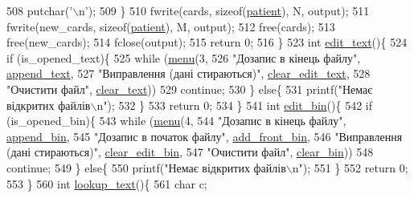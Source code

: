 \begin{DoxyCodeInclude}
{{{{{508         putchar(\textcolor{charliteral}{'\(\backslash\)n'});
509     \}
510     fwrite(cards, \textcolor{keyword}{sizeof}(\hyperlink{structpatient__struct}{patient}), N, output);
511     fwrite(new\_cards, \textcolor{keyword}{sizeof}(\hyperlink{structpatient__struct}{patient}), M, output);
512     free(cards);
513     free(new\_cards);
514     fclose(output);
515     \textcolor{keywordflow}{return} 0;
516 \}
523 \textcolor{keywordtype}{int} \hyperlink{main_8c_ab359f03309c64d2e7fb3eac80e34160f}{edit\_text}()\{
524     \textcolor{keywordflow}{if} (is\_opened\_text)\{
525         \textcolor{keywordflow}{while} (\hyperlink{lab__functions_8h_a5f3f744789213f961f3c8ec1cc482af7}{menu}(3,
526                 \textcolor{stringliteral}{"Дозапис в кінець файлу"}, \hyperlink{main_8c_ad69ac85cc5d44de29b1448bd72937203}{append\_text},
527                 \textcolor{stringliteral}{"Виправлення (дані стираються)"}, \hyperlink{main_8c_af649673615b84141d61a31bf103e436a}{clear\_edit\_text},
528                 \textcolor{stringliteral}{"Очистити файл"}, \hyperlink{main_8c_a69f822b267f0ba6c163047774f960aa8}{clear\_text}))
529             \textcolor{keywordflow}{continue};
530     \} \textcolor{keywordflow}{else}\{
531         printf(\textcolor{stringliteral}{"Немає відкритих файлів\(\backslash\)n"});
532     \}
533     \textcolor{keywordflow}{return} 0;
534 \}
541 \textcolor{keywordtype}{int} \hyperlink{main_8c_af33bf0e042c671b0a02da4460055fca1}{edit\_bin}()\{
542     \textcolor{keywordflow}{if} (is\_opened\_bin)\{
543         \textcolor{keywordflow}{while} (\hyperlink{lab__functions_8h_a5f3f744789213f961f3c8ec1cc482af7}{menu}(4,
544                     \textcolor{stringliteral}{"Дозапис в кінець файлу"}, \hyperlink{main_8c_a5e87855f218fa953fdc1649bf832bb9c}{append\_bin},
545                     \textcolor{stringliteral}{"Дозапис в початок файлу"}, \hyperlink{main_8c_ab15bf3ab548bb875cba6b67d6d7a4cc4}{add\_front\_bin},
546                     \textcolor{stringliteral}{"Виправлення (дані стираються)"}, \hyperlink{main_8c_aca18af51c5eba9da8b5ffabbaf06c01f}{clear\_edit\_bin},
547                     \textcolor{stringliteral}{"Очистити файл"}, \hyperlink{main_8c_ae4a97e0e6277901e41f56dd2cb52aeaa}{clear\_bin}))
548             \textcolor{keywordflow}{continue};
549     \} \textcolor{keywordflow}{else}\{
550         printf(\textcolor{stringliteral}{"Немає відкритих файлів\(\backslash\)n"});
551     \}
552     \textcolor{keywordflow}{return} 0;
553 \}
560 \textcolor{keywordtype}{int} \hyperlink{main_8c_a15e3f231d0bcb54bf66a3ffb3ca18e76}{lookup\_text}()\{
561     \textcolor{keywordtype}{char} c;
}}}}}
\end{DoxyCodeInclude}
